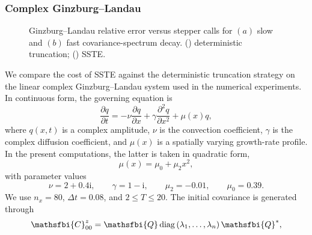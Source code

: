 \subsubsection{Complex Ginzburg--Landau}
\label{sec:appendix_verification_gl}
\begin{figure}
    \centering
    \begin{minipage}[t]{0.49\textwidth}
        \centering
        \vspace{0pt}
        
    \end{minipage}
    \hfill
    \begin{minipage}[t]{0.49\textwidth}
        \centering
        \vspace{0pt}
        
    \end{minipage}
    \caption{Ginzburg--Landau relative error versus stepper calls for \((a)\) slow and \((b)\) fast covariance-spectrum decay. (\solidlegend) deterministic truncation; (\dashlegend\circlegend) SSTE.}
    \label{fig:GL_eig_vs_sste}
\end{figure}
We compare the cost of SSTE against the deterministic truncation strategy on the linear complex Ginzburg--Landau system used in the numerical experiments. In continuous form, the governing equation is
\begin{equation}
  \frac{\partial q}{\partial t}
  =
  -\nu\frac{\partial q}{\partial x}
  +
  \gamma\frac{\partial^2 q}{\partial x^2}
  +
  \mu(x)q,
  \label{eq:GL_continuous_equation_sste_necessity}
\end{equation}
where \(q(x,t)\) is a complex amplitude, \(\nu\) is the convection coefficient, \(\gamma\) is the complex diffusion coefficient, and \(\mu(x)\) is a spatially varying growth-rate profile. In the present computations, the latter is taken in quadratic form,
\begin{equation}
  \mu(x)
  =
  \mu_0+\mu_2x^2,
  \label{eq:GL_mu_profile_sste_necessity}
\end{equation}
with parameter values
\begin{equation}
  \nu = 2+0.4\mathrm{i},
  \qquad
  \gamma = 1-\mathrm{i},
  \qquad
  \mu_2 = -0.01,
  \qquad
  \mu_0 = 0.39.
  \label{eq:GL_parameters_sste_necessity}
\end{equation}
We use \(n_x=80\), \(\Delta t=0.08\), and \(2\leq T\leq20\).
The initial covariance is generated through
\begin{equation}
  \mathsfbi{C}_{00}^{z}
  =
  \mathsfbi{Q}
  \operatorname{diag}
  \left(
    \lambda_1,\dots,\lambda_n
  \right)
  \mathsfbi{Q}^{*},
  \label{eq:GL_covariance_construction_sste_necessity}
\end{equation}
